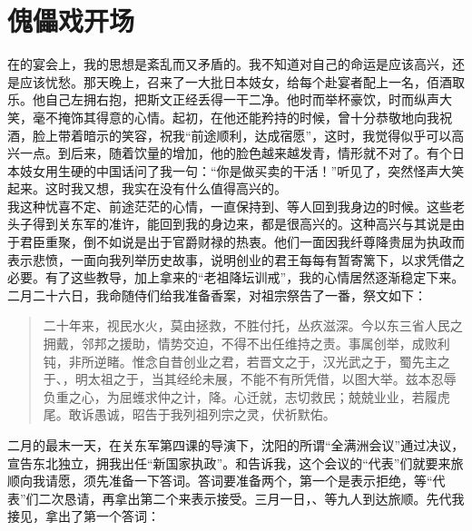 \fancyhead[RO]{\thepage} %
\fancyhead[LE]{\thepage} %
\chapter*{傀儡戏开场}
  在的宴会上，我的思想是紊乱而又矛盾的。我不知道对自己的命运是应该高兴，还是应该忧愁。那天晚上，召来了一大批日本妓女，给每个赴宴者配上一名，佰酒取乐。他自己左拥右抱，把斯文正经丢得一干二净。他时而举杯豪饮，时而纵声大笑，毫不掩饰其得意的心情。起初，在他还能矜持的时候，曾十分恭敬地向我祝酒，脸上带着暗示的笑容，祝我“前途顺利，达成宿愿”，这时，我觉得似乎可以高兴一点。到后来，随着饮量的增加，他的脸色越来越发青，情形就不对了。有个日本妓女用生硬的中国话问了我一句：“你是做买卖的干活！”听见了，突然怪声大笑起来。这时我又想，我实在没有什么值得高兴的。\\

我这种忧喜不定、前途茫茫的心情，一直保持到、等人回到我身边的时候。这些老头子得到关东军的准许，能回到我的身边来，都是很高兴的。这种高兴与其说是由于君臣重聚，倒不如说是出于官爵财禄的热衷。他们一面因我纤尊降贵屈为执政而表示悲愤，一面向我列举历史故事，说明创业的君王每每有暂寄篱下，以求凭借之必要。有了这些教导，加上拿来的“老祖降坛训戒”，我的心情居然逐渐稳定下来。二月二十六日，我命随侍们给我准备香案，对祖宗祭告了一番，祭文如下：\\

\begin{quote}
	二十年来，视民水火，莫由拯救，不胜付托，丛疚滋深。今以东三省人民之拥戴，邻邦之援助，情势交迫，不得不出任维持之责。事属创举，成败利钝，非所逆睹。惟念自昔创业之君，若晋文之于，汉光武之于，蜀先主之于、，明太祖之于，当其经纶未展，不能不有所凭借，以图大举。兹本忍辱负重之心，为屈蠖求仲之计，降。心迁就，志切救民；兢兢业业，若履虎尾。敢诉愚诚，昭告于我列祖列宗之灵，伏祈默佑。\\
\end{quote}

二月的最末一天，在关东军第四课的导演下，沈阳的所谓“全满洲会议”通过决议，宣告东北独立，拥我出任“新国家执政”。和告诉我，这个会议的“代表”们就要来旅顺向我请愿，须先准备一下答词。答词要准备两个，第一个是表示拒绝，等“代表”们二次恳请，再拿出第二个来表示接受。三月一日，、等九人到达旅顺。先代我接见，拿出了第一个答词：\\

